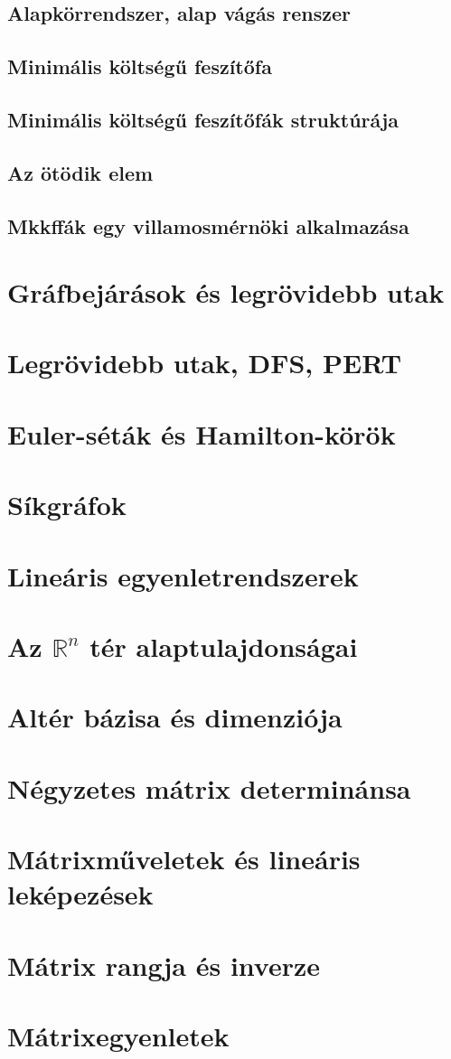 \documentclass[12pt]{article}
\begin{document}
		\subsection{Alapkörrendszer, alap vágás renszer}
		\subsection{Minimális költségű feszítőfa}
		\subsection{Minimális költségű feszítőfák struktúrája}
		\subsection{Az ötödik elem}
		\subsection{Mkkffák egy villamosmérnöki alkalmazása}
		
	\section{Gráfbejárások és legrövidebb utak}
		
	\section{Legrövidebb utak, DFS, PERT}
		
	\section{Euler-séták és Hamilton-körök}
	
	\section{Síkgráfok}
	
	\section{Lineáris egyenletrendszerek}
	
	\section{Az \(\mathbb{R}^n\) tér alaptulajdonságai}
	
	\section{Altér bázisa és dimenziója}
	
	\section{Négyzetes mátrix determinánsa}
	
	\section{Mátrixműveletek és lineáris leképezések}
	
	\section{Mátrix rangja és inverze}
	
	\section{Mátrixegyenletek}
	
\end{document}
